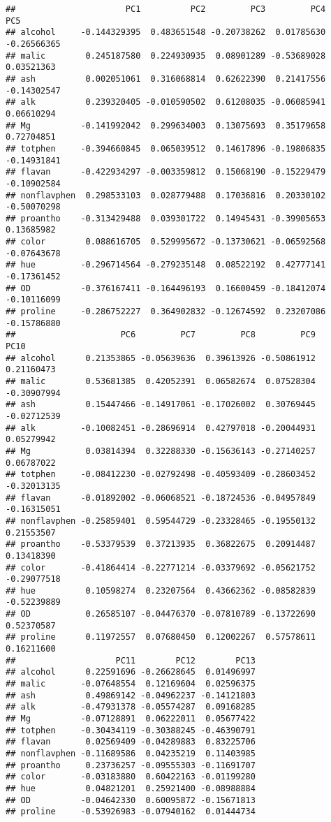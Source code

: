 \documentclass[
]{book}
\begin{document}
\begin{verbatim}
##                      PC1          PC2         PC3         PC4         PC5
## alcohol     -0.144329395  0.483651548 -0.20738262  0.01785630 -0.26566365
## malic        0.245187580  0.224930935  0.08901289 -0.53689028  0.03521363
## ash          0.002051061  0.316068814  0.62622390  0.21417556 -0.14302547
## alk          0.239320405 -0.010590502  0.61208035 -0.06085941  0.06610294
## Mg          -0.141992042  0.299634003  0.13075693  0.35179658  0.72704851
## totphen     -0.394660845  0.065039512  0.14617896 -0.19806835 -0.14931841
## flavan      -0.422934297 -0.003359812  0.15068190 -0.15229479 -0.10902584
## nonflavphen  0.298533103  0.028779488  0.17036816  0.20330102 -0.50070298
## proantho    -0.313429488  0.039301722  0.14945431 -0.39905653  0.13685982
## color        0.088616705  0.529995672 -0.13730621 -0.06592568 -0.07643678
## hue         -0.296714564 -0.279235148  0.08522192  0.42777141 -0.17361452
## OD          -0.376167411 -0.164496193  0.16600459 -0.18412074 -0.10116099
## proline     -0.286752227  0.364902832 -0.12674592  0.23207086 -0.15786880
##                     PC6         PC7         PC8         PC9        PC10
## alcohol      0.21353865 -0.05639636  0.39613926 -0.50861912  0.21160473
## malic        0.53681385  0.42052391  0.06582674  0.07528304 -0.30907994
## ash          0.15447466 -0.14917061 -0.17026002  0.30769445 -0.02712539
## alk         -0.10082451 -0.28696914  0.42797018 -0.20044931  0.05279942
## Mg           0.03814394  0.32288330 -0.15636143 -0.27140257  0.06787022
## totphen     -0.08412230 -0.02792498 -0.40593409 -0.28603452 -0.32013135
## flavan      -0.01892002 -0.06068521 -0.18724536 -0.04957849 -0.16315051
## nonflavphen -0.25859401  0.59544729 -0.23328465 -0.19550132  0.21553507
## proantho    -0.53379539  0.37213935  0.36822675  0.20914487  0.13418390
## color       -0.41864414 -0.22771214 -0.03379692 -0.05621752 -0.29077518
## hue          0.10598274  0.23207564  0.43662362 -0.08582839 -0.52239889
## OD           0.26585107 -0.04476370 -0.07810789 -0.13722690  0.52370587
## proline      0.11972557  0.07680450  0.12002267  0.57578611  0.16211600
##                    PC11        PC12        PC13
## alcohol      0.22591696 -0.26628645  0.01496997
## malic       -0.07648554  0.12169604  0.02596375
## ash          0.49869142 -0.04962237 -0.14121803
## alk         -0.47931378 -0.05574287  0.09168285
## Mg          -0.07128891  0.06222011  0.05677422
## totphen     -0.30434119 -0.30388245 -0.46390791
## flavan       0.02569409 -0.04289883  0.83225706
## nonflavphen -0.11689586  0.04235219  0.11403985
## proantho     0.23736257 -0.09555303 -0.11691707
## color       -0.03183880  0.60422163 -0.01199280
## hue          0.04821201  0.25921400 -0.08988884
## OD          -0.04642330  0.60095872 -0.15671813
## proline     -0.53926983 -0.07940162  0.01444734
\end{verbatim}
\end{document}
